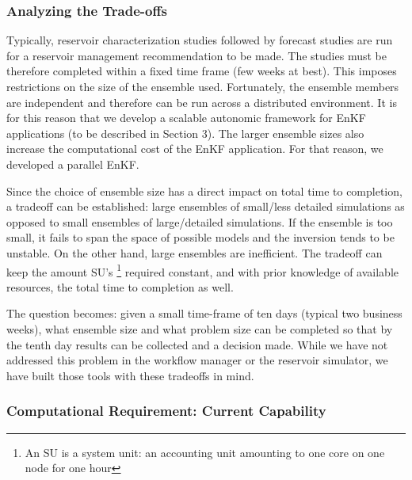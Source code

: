 \documentclass{acm_proc_article-sp}
\newcommand{\jhanote}[1]{ {\textcolor{red} { ***Jha: #1 }}}
\newcommand{\yyenote}[1]{ {\textcolor{blue} { ***yye00: #1 }}}
\newcommand{\jhanote}[1]{}
\newcommand{\yyenote}[1]{}
\begin{document}
\subsubsection{Analyzing the Trade-offs}  

Typically, reservoir characterization studies followed by forecast
studies are run for a reservoir management recommendation to be
made. The studies must be therefore completed within a fixed time frame
(few weeks at best). This imposes restrictions on the size of the
ensemble used. Fortunately, the ensemble members are independent
and therefore can be run across a distributed environment. It is for this
reason that we develop a scalable autonomic framework for EnKF
applications (to be described in Section 3). The larger ensemble sizes
also increase the computational cost of the EnKF application. For that
reason, we developed a parallel EnKF.

Since the choice of ensemble size has a direct impact on total time to
completion, a tradeoff can be established: large ensembles of
small/less detailed simulations as opposed to small ensembles of
large/detailed simulations. If the ensemble is too small, it fails to
span the space of possible models and the inversion tends to
be unstable. On the other hand, large ensembles are
inefficient. The tradeoff can keep the amount SU's
\footnote{An SU is a system unit: an accounting unit
amounting to one core on one node for one hour} required
constant, and with prior knowledge of available resources, the total
time to completion as well.

The question becomes: given a small
time-frame of ten days (typical two business weeks), what ensemble size and what
problem size can be completed so that by the tenth day results can be
collected and a decision made. While we have not addressed this
problem in the workflow manager or the reservoir simulator, we have
built those tools with these tradeoffs in mind.


\subsubsection{Computational Requirement: Current Capability}
\label{sec:compreq}
\end{document}
